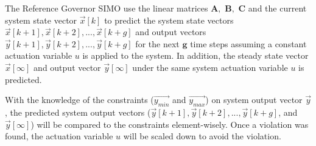   The Reference Governor SIMO use the linear matrices \begin{math} \textbf{A},\textbf{ B}, \textbf{ C} \end{math} and the 
  current system state vector \begin{math} \overrightarrow{x}[k] \end{math} to predict the system state vectors
  \begin{math} \overrightarrow{x}[k+1],\overrightarrow{x}[k+2], ... ,\overrightarrow{x}[k+g] \end{math} and output vectors 
  \begin{math} \overrightarrow{y}[k+1],\overrightarrow{y}[k+2], ... ,\overrightarrow{y}[k+g] \end{math} for the next 
  \begin{math} \textbf{g} \end{math} time steps assuming a constant actuation variable \begin{math} u \end{math} is 
  applied to the system. In addition, the steady state vector 
  \begin{math} \overrightarrow{x}[\infty]\end{math} and output vector \begin{math} \overrightarrow{y}[\infty]\end{math} 
  under the same system actuation variable \begin{math} u \end{math} is predicted.


  With the knowledge of the constraints 
  (\begin{math} \overrightarrow{y_{min}} \end{math} and \begin{math} \overrightarrow{y_{max}} \end{math}) 
  on system output vector \begin{math} \overrightarrow{y} \end{math}, the predicted system output vectors 
  (\begin{math} \overrightarrow{y}[k+1],\overrightarrow{y}[k+2], ... ,\overrightarrow{y}[k+g] \end{math}, 
  and \begin{math} \overrightarrow{y}[\infty]\end{math}) 
  will be compared to the constraints element-wisely. Once a violation was found, the actuation variable 
  \begin{math} u \end{math} will be scaled down to avoid the violation.

